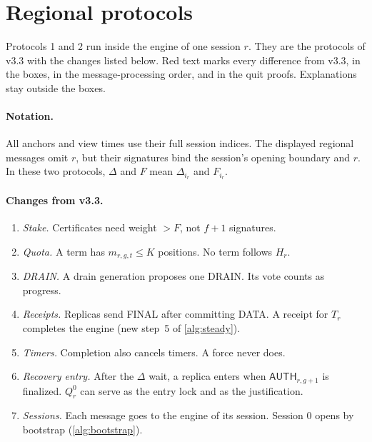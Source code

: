 \documentclass[11pt,a4paper]{article}
\newcommand{\RR}[1]{{\color{rrRed}#1}}
\newcommand{\tagg}[1]{\ensuremath{\mathsf{#1}}}
\newcounter{protocol}
\begin{document}
\section{Regional protocols}
\label{sec:protocols}
Protocols 1 and 2 run inside the engine of one session $r$. They are the
protocols of v3.3 with the changes listed below. \RR{Red text} marks
every difference from v3.3, in the boxes, in the message-processing
order, and in the quit proofs. Explanations stay outside the boxes.

\paragraph{Notation.}
All anchors and view times use their full session indices. The displayed
regional messages omit $r$, but their signatures bind the session's
opening boundary and $r$. In these two protocols, $\Delta$ and $F$ mean
$\Delta_{i_r}$ and $F_{i_r}$.

\paragraph{Changes from v3.3.}
\begin{enumerate}[label=\arabic*.]
\item \emph{Stake.} Certificates need weight $>F$, not $f+1$ signatures.
\item \emph{Quota.} A term has $m_{r,g,t}\le K$ positions. No term follows
$H_r$.
\item \emph{DRAIN.} A drain generation proposes one DRAIN. Its vote
counts as progress.
\item \emph{Receipts.} Replicas send FINAL after committing DATA. A
receipt for $T_r$ completes the engine (new step~5 of \cref{alg:steady}).
\item \emph{Timers.} Completion also cancels timers. A force never does.
\item \emph{Recovery entry.} After the $\Delta$ wait, a replica enters
when $\tagg{AUTH}_{r,g+1}$ is finalized. $Q_r^0$ can serve as the entry
lock and as the justification.
\item \emph{Sessions.} Each message goes to the engine of its session.
Session $0$ opens by bootstrap (\cref{alg:bootstrap}).
\end{enumerate}
\end{document}
